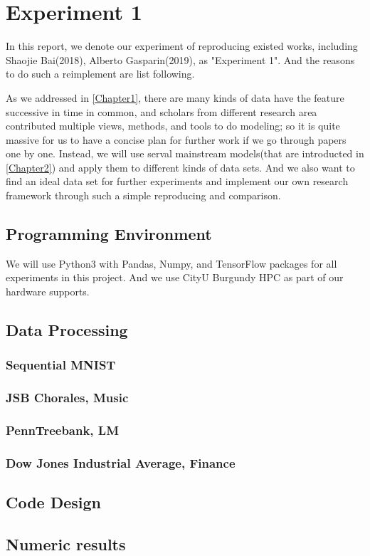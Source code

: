 
\chapter{Experiment 1} %

\label{Chapter3} %


In this report, we denote our experiment of reproducing existed works, including Shaojie Bai(2018), Alberto Gasparin(2019), as "Experiment 1". And the reasons to do such a reimplement are list following.

As we addressed in \ref{Chapter1}, there are many kinds of data have the feature successive in time in common, and scholars from different research area contributed multiple views, methods, and tools to do modeling; so it is quite massive for us to have a concise plan for further work if we go through papers one by one. Instead, we will use serval mainstream models(that are introducted in \ref{Chapter2}) and apply them to different kinds of data sets. And we also want to find an ideal data set for further experiments and implement our own research framework through such a simple reproducing and comparison. 

\section{Programming Environment}
We will use Python3 with Pandas, Numpy, and TensorFlow packages for all experiments in this project. And we use CityU Burgundy HPC as part of our hardware supports.

\section{Data Processing}

\subsection{Sequential MNIST}
\subsection{JSB Chorales, Music}
\subsection{PennTreebank, LM}
\subsection{Dow Jones Industrial Average, Finance}

\section{Code Design}


\section{Numeric results}
